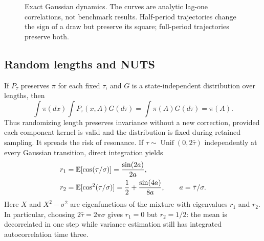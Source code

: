 \begin{figure}[htbp]
\centering
{}
\caption{Exact Gaussian dynamics. The curves are analytic lag-one
correlations, not benchmark results. Half-period trajectories change the sign
of a draw but preserve its square; full-period trajectories preserve both.}
\label{fig:bf-modern-resonance}
\end{figure}

\subsection{Random lengths and NUTS}

If $P_\tau$ preserves $\pi$ for each fixed $\tau$, and $G$ is a
state-independent distribution over lengths, then
\begin{equation}
 \int\pi(dx)\int P_\tau(x,A)G(d\tau)
   =\int\pi(A)G(d\tau)=\pi(A).
 \label{eq:bf-modern-mixture-invariance}
\end{equation}
Thus randomizing length preserves invariance without a new correction,
provided each component kernel is valid and the distribution is fixed during
retained sampling. It spreads the risk of resonance. If
$\tau\sim\operatorname{Unif}(0,2\bar\tau)$ independently at every
Gaussian transition, direct integration yields
\begin{align}
 r_1&=\mathbb{E}[\cos(\tau/\sigma)]
       =\frac{\sin(2a)}{2a},\\
 r_2&=\mathbb{E}[\cos^2(\tau/\sigma)]
       =\frac12+\frac{\sin(4a)}{8a},
 \qquad a=\bar\tau/\sigma.
 \label{eq:bf-modern-random-length-correlations}
\end{align}
Here $X$ and $X^2-\sigma^2$ are eigenfunctions of the mixture with
eigenvalues $r_1$ and $r_2$. In particular, choosing $2\bar\tau=2\pi\sigma$
gives $r_1=0$ but $r_2=1/2$: the mean is decorrelated in one step while
variance estimation still has integrated autocorrelation time three.

